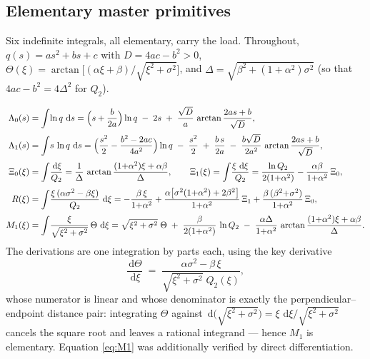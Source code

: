 \documentclass[11pt]{article}
\newcommand{\atan}{\operatorname{arctan}}
\newcommand{\dd}{\,\mathrm{d}}
\begin{document}
\subsection{Elementary master primitives}
\label{sec:masters}

Six indefinite integrals, all elementary, carry the load.  Throughout,
$q(s)=a s^2+bs+c$ with $D=4ac-b^2>0$,
$\Theta(\xi)=\atan\!\bigl[(\alpha\xi+\beta)/\sqrt{\xi^2+\sigma^2}\bigr]$, and
$\Delta=\sqrt{\beta^2+(1{+}\alpha^2)\sigma^2}$ (so that $4ac-b^2 = 4\Delta^2$ for
$Q_2$).

\begin{align}
  \Lambda_0(s) &= \int\!\ln q\,\dd s
   = \Bigl(s+\frac{b}{2a}\Bigr)\ln q \;-\;2s\;+\;\frac{\sqrt D}{a}\,
     \atan\frac{2as+b}{\sqrt D},
  \label{eq:Lam0}\\[2pt]
  \Lambda_1(s) &= \int\! s\,\ln q\,\dd s
   = \Bigl(\frac{s^2}{2}-\frac{b^2-2ac}{4a^2}\Bigr)\ln q
     \;-\;\frac{s^2}{2}\;+\;\frac{b\,s}{2a}
     \;-\;\frac{b\sqrt D}{2a^2}\,\atan\frac{2as+b}{\sqrt D},
  \label{eq:Lam1}\\[2pt]
  \Xi_0(\xi) &= \int\!\frac{\dd\xi}{Q_2}
   = \frac{1}{\Delta}\,\atan\frac{(1{+}\alpha^2)\xi+\alpha\beta}{\Delta},
  \qquad
  \Xi_1(\xi) = \int\!\frac{\xi\,\dd\xi}{Q_2}
   = \frac{\ln Q_2}{2(1{+}\alpha^2)}-\frac{\alpha\beta}{1{+}\alpha^2}\,\Xi_0 ,
  \label{eq:Xi}\\[2pt]
  R(\xi) &= \int\!\frac{\xi\,(\alpha\sigma^2-\beta\xi)}{Q_2}\,\dd\xi
   = -\frac{\beta\,\xi}{1{+}\alpha^2}
     +\frac{\alpha\bigl[\sigma^2(1{+}\alpha^2)+2\beta^2\bigr]}{1{+}\alpha^2}\,\Xi_1
     +\frac{\beta\,(\beta^2{+}\sigma^2)}{1{+}\alpha^2}\,\Xi_0 ,
  \label{eq:R}\\[2pt]
  M_1(\xi) &= \int\!\frac{\xi}{\sqrt{\xi^2+\sigma^2}}\,\Theta\,\dd\xi
   = \sqrt{\xi^2+\sigma^2}\;\Theta
     \;+\;\frac{\beta}{2(1{+}\alpha^2)}\,\ln Q_2
     \;-\;\frac{\alpha\Delta}{1{+}\alpha^2}\,
        \atan\frac{(1{+}\alpha^2)\xi+\alpha\beta}{\Delta}.
  \label{eq:M1}
\end{align}
The derivations are one integration by parts each, using the key derivative
\begin{equation}
  \frac{\dd\Theta}{\dd\xi}
  \;=\; \frac{\alpha\sigma^2-\beta\,\xi}{\sqrt{\xi^2+\sigma^2}\;Q_2(\xi)} ,
  \label{eq:dTheta}
\end{equation}
whose numerator is linear and whose denominator is exactly the
perpendicular--endpoint distance pair: integrating $\Theta$ against
$\dd\bigl(\sqrt{\xi^2+\sigma^2}\bigr)=\xi\,\dd\xi/\sqrt{\xi^2+\sigma^2}$ cancels the
square root and leaves a rational integrand --- hence $M_1$ is elementary.
Equation \eqref{eq:M1} was additionally verified by direct differentiation.
\end{document}
